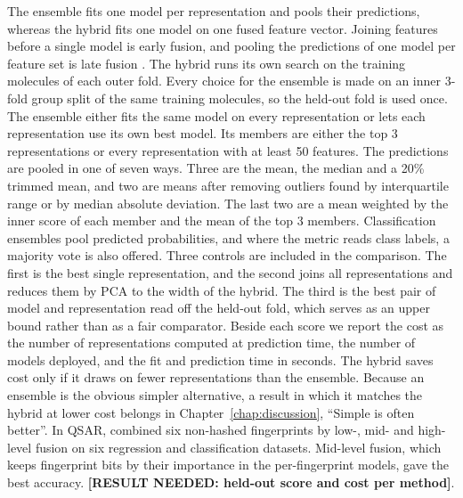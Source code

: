 The ensemble fits one model per representation and pools their predictions, whereas the hybrid fits one model on one fused feature vector. Joining features before a single model is early fusion, and pooling the predictions of one model per feature set is late fusion \citep{Stahlschmidt2022}. The hybrid runs its own search on the training molecules of each outer fold. Every choice for the ensemble is made on an inner 3-fold group split of the same training molecules, so the held-out fold is used once. The ensemble either fits the same model on every representation or lets each representation use its own best model. Its members are either the top 3 representations or every representation with at least 50 features. The predictions are pooled in one of seven ways. Three are the mean, the median and a 20\% trimmed mean, and two are means after removing outliers found by interquartile range or by median absolute deviation. The last two are a mean weighted by the inner score of each member and the mean of the top 3 members. Classification ensembles pool predicted probabilities, and where the metric reads class labels, a majority vote is also offered. Three controls are included in the comparison. The first is the best single representation, and the second joins all representations and reduces them by PCA to the width of the hybrid. The third is the best pair of model and representation read off the held-out fold, which serves as an upper bound rather than as a fair comparator. Beside each score we report the cost as the number of representations computed at prediction time, the number of models deployed, and the fit and prediction time in seconds. The hybrid saves cost only if it draws on fewer representations than the ensemble. Because an ensemble is the obvious simpler alternative, a result in which it matches the hybrid at lower cost belongs in Chapter~\ref{chap:discussion}, ``Simple is often better''. In QSAR, \citet{Turkina2025} combined six non-hashed fingerprints by low-, mid- and high-level fusion on six regression and classification datasets. Mid-level fusion, which keeps fingerprint bits by their importance in the per-fingerprint models, gave the best accuracy. \textbf{[RESULT NEEDED: held-out score and cost per method]}.


